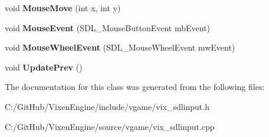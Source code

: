 \begin{DoxyCompactItemize}
\item 
\hypertarget{class_vixen_1_1_s_d_l_mouse_state_aa7a0735b542d59197259c77b817018a3}{}void {\bfseries Mouse\+Move} (int x, int y)\label{class_vixen_1_1_s_d_l_mouse_state_aa7a0735b542d59197259c77b817018a3}

\item 
\hypertarget{class_vixen_1_1_s_d_l_mouse_state_ac03e26af27166b5280f8e9b787f4270d}{}void {\bfseries Mouse\+Event} (S\+D\+L\+\_\+\+Mouse\+Button\+Event mb\+Event)\label{class_vixen_1_1_s_d_l_mouse_state_ac03e26af27166b5280f8e9b787f4270d}

\item 
\hypertarget{class_vixen_1_1_s_d_l_mouse_state_adace6355624685c83fb2827d7af0b75c}{}void {\bfseries Mouse\+Wheel\+Event} (S\+D\+L\+\_\+\+Mouse\+Wheel\+Event mw\+Event)\label{class_vixen_1_1_s_d_l_mouse_state_adace6355624685c83fb2827d7af0b75c}

\item 
\hypertarget{class_vixen_1_1_s_d_l_mouse_state_aea2e9e57ccacef248671224613ad483c}{}void {\bfseries Update\+Prev} ()\label{class_vixen_1_1_s_d_l_mouse_state_aea2e9e57ccacef248671224613ad483c}

\end{DoxyCompactItemize}


The documentation for this class was generated from the following files\+:\begin{DoxyCompactItemize}
\item 
C\+:/\+Git\+Hub/\+Vixen\+Engine/include/vgame/vix\+\_\+sdlinput.\+h\item 
C\+:/\+Git\+Hub/\+Vixen\+Engine/source/vgame/vix\+\_\+sdlinput.\+cpp\end{DoxyCompactItemize}
